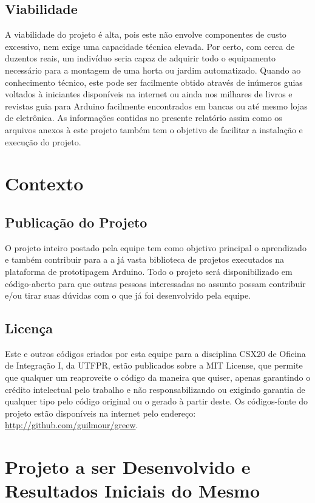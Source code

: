 \documentclass[a4paper,12pt]{article}
\begin{document}
\subsection{Viabilidade}
A viabilidade do projeto é alta, pois este não envolve componentes de custo excessivo, nem exige uma capacidade técnica elevada. Por certo, com cerca de duzentos reais, um indivíduo seria capaz de adquirir todo o equipamento necessário para a montagem de uma horta ou jardim automatizado. Quando ao conhecimento técnico, este pode ser facilmente obtido através de inúmeros guias voltados à iniciantes disponíveis na internet ou ainda nos milhares de livros e revistas guia para Arduino facilmente encontrados em bancas ou até mesmo lojas de eletrônica. As informações contidas no presente relatório assim como os arquivos anexos à este projeto também tem o objetivo de facilitar a instalação e execução do projeto.

\section{Contexto}
\subsection{Publicação do Projeto}
O projeto inteiro postado pela equipe tem como objetivo principal o aprendizado e também contribuir para a a já vasta biblioteca de projetos executados na plataforma de prototipagem Arduino. Todo o projeto será disponibilizado em código-aberto para que outras pessoas interessadas no assunto possam contribuir e/ou tirar suas dúvidas com o que já foi desenvolvido pela equipe. 
\subsection{Licença}
Este e outros códigos criados por esta equipe para a disciplina CSX20 de Oficina de Integração I, da UTFPR, estão publicados sobre a MIT License, que permite que qualquer um reaproveite o código da maneira que quiser, apenas garantindo o crédito intelectual pelo trabalho e não responsabilizando ou exigindo garantia de qualquer tipo pelo código original ou o gerado à partir deste. Os códigos-fonte do projeto estão disponíveis na internet pelo endereço: \href{http://github.com/guilmour/greew}{http://github.com/guilmour/greew}.

\section{Projeto a ser Desenvolvido e Resultados Iniciais do Mesmo}
\end{document}
